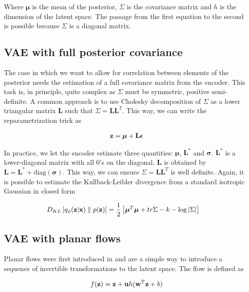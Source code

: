 \documentclass[12pt]{article}
\begin{document}
Where \(\boldsymbol{\mu}\) is the mean of the posterior, \(\Sigma\) is the covariance matrix and \(h\) is the dimension of the latent space. The passage from the first equation to the second is possible because \(\Sigma\) is a diagonal matrix. 

\subsection{VAE with full posterior covariance}

The case in which we want to allow for correlation between elements of the posterior needs the estimation of a full covariance matrix from the encoder. This task is, in principle, quite complex as \(\Sigma\) must be symmetric, positive semi-definite. A common approach \cite{VAEIntro} is to use Cholesky decomposition of \(\Sigma\) as a lower triangular matrix \(\mathbf{L}\) such that \(\Sigma = \mathbf{L}\mathbf{L}^T\). This way, we can write the reparametrization trick as

\begin{align}
    \textbf{z} = \boldsymbol{\mu} + \mathbf{L}\bm{\epsilon}
\end{align}

In practice, we let the encoder estimate three quantities: \(\boldsymbol{\mu}\), \(\mathbf{L}^*\) and \(\boldsymbol{\sigma}\). \(\mathbf{L}^*\) is a lower-diagonal matrix with all 0's on the diagonal. \(\mathbf{L}\) is obtained by \(\mathbf{L} = \mathbf{L}^* + \text{diag}(\boldsymbol{\sigma})\). This way, we can ensure \(\Sigma = \mathbf{L}\mathbf{L}^T\) is well definite. Again, it is possible to estimate the Kullback-Leibler divergence from a standard isotropic Gaussian in closed form

\begin{align}
    D_{KL} \left[ q_{\phi}(\textbf{z}|\textbf{x}) \parallel p(\textbf{z}) \right] &= \frac{1}{2}\left[\boldsymbol{\mu}^T \boldsymbol{\mu} + tr{\Sigma} - k - \log \left| \Sigma \right| \right] 
\end{align}


\subsection{VAE with planar flows}

Planar flows were first introduced in \cite{Mohamed2015VariationalIM} and are a simple way to introduce a sequence of invertible transformations to the latent space. The flow is defined as

\begin{align}
    f(\textbf{z}) = \textbf{z} + \mathbf{u}h(\mathbf{w}^T\textbf{z} + b)
\end{align}
\end{document}
